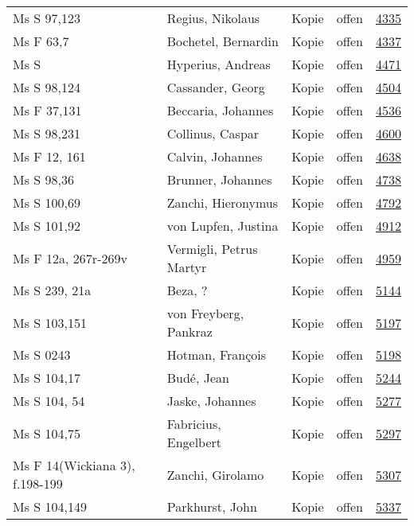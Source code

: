 \documentclass[10pt,a4paper,landscape]{report}
\begin{document}
\begin{longtable}{p{16cm}p{4cm}llr}
Ms S 97,123	&	Regius, Nikolaus	&	Kopie	&	offen	&	\href{http://130.60.24.72/assignment/4335}{4335}\\
Ms F 63,7	&	Bochetel, Bernardin	&	Kopie	&	offen	&	\href{http://130.60.24.72/assignment/4337}{4337}\\
Ms S	&	Hyperius, Andreas	&	Kopie	&	offen	&	\href{http://130.60.24.72/assignment/4471}{4471}\\
Ms S 98,124	&	Cassander, Georg	&	Kopie	&	offen	&	\href{http://130.60.24.72/assignment/4504}{4504}\\
Ms F 37,131	&	Beccaria, Johannes	&	Kopie	&	offen	&	\href{http://130.60.24.72/assignment/4536}{4536}\\
Ms S 98,231	&	Collinus, Caspar	&	Kopie	&	offen	&	\href{http://130.60.24.72/assignment/4600}{4600}\\
Ms F 12, 161	&	Calvin, Johannes	&	Kopie	&	offen	&	\href{http://130.60.24.72/assignment/4638}{4638}\\
Ms S 98,36	&	Brunner, Johannes	&	Kopie	&	offen	&	\href{http://130.60.24.72/assignment/4738}{4738}\\
Ms S 100,69	&	Zanchi, Hieronymus	&	Kopie	&	offen	&	\href{http://130.60.24.72/assignment/4792}{4792}\\
Ms S 101,92	&	von Lupfen, Justina	&	Kopie	&	offen	&	\href{http://130.60.24.72/assignment/4912}{4912}\\
Ms F 12a, 267r-269v	&	Vermigli, Petrus Martyr	&	Kopie	&	offen	&	\href{http://130.60.24.72/assignment/4959}{4959}\\
Ms S 239, 21a	&	Beza, ?	&	Kopie	&	offen	&	\href{http://130.60.24.72/assignment/5144}{5144}\\
Ms S 103,151	&	von Freyberg, Pankraz	&	Kopie	&	offen	&	\href{http://130.60.24.72/assignment/5197}{5197}\\
Ms S 0243	&	Hotman, François	&	Kopie	&	offen	&	\href{http://130.60.24.72/assignment/5198}{5198}\\
Ms S 104,17	&	Budé, Jean	&	Kopie	&	offen	&	\href{http://130.60.24.72/assignment/5244}{5244}\\
Ms S 104, 54	&	Jaske, Johannes	&	Kopie	&	offen	&	\href{http://130.60.24.72/assignment/5277}{5277}\\
Ms S 104,75	&	Fabricius, Engelbert	&	Kopie	&	offen	&	\href{http://130.60.24.72/assignment/5297}{5297}\\
Ms F 14(Wickiana 3), f.198-199	&	Zanchi, Girolamo	&	Kopie	&	offen	&	\href{http://130.60.24.72/assignment/5307}{5307}\\
Ms S 104,149	&	Parkhurst, John	&	Kopie	&	offen	&	\href{http://130.60.24.72/assignment/5337}{5337}\\

\end{longtable}
\end{document}
